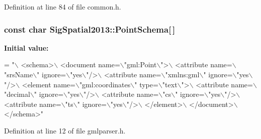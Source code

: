 Definition at line 84 of file common.\-h.

\hypertarget{namespaceSigSpatial2013_a40970b19a17f8bf52c4dad47be296e71}{
\subsubsection[{Point\-Schema}]{\setlength{\rightskip}{0pt plus 5cm}const char Sig\-Spatial2013\-::\-Point\-Schema\mbox{[}$\,$\mbox{]}}}\label{namespaceSigSpatial2013_a40970b19a17f8bf52c4dad47be296e71}
{\bfseries Initial value\-:}
\begin{DoxyCode}
= \textcolor{stringliteral}{"\(\backslash\)}
\textcolor{stringliteral}{<schema>\(\backslash\)}
\textcolor{stringliteral}{  <document name=\(\backslash\)"gml:Point\(\backslash\)">\(\backslash\)}
\textcolor{stringliteral}{    <attribute name=\(\backslash\)"srsName\(\backslash\)" ignore=\(\backslash\)"yes\(\backslash\)"/>\(\backslash\)}
\textcolor{stringliteral}{    <attribute name=\(\backslash\)"xmlns:gml\(\backslash\)" ignore=\(\backslash\)"yes\(\backslash\)"/>\(\backslash\)}
\textcolor{stringliteral}{    <element name=\(\backslash\)"gml:coordinates\(\backslash\)" type=\(\backslash\)"text\(\backslash\)">\(\backslash\)}
\textcolor{stringliteral}{      <attribute name=\(\backslash\)"decimal\(\backslash\)" ignore=\(\backslash\)"yes\(\backslash\)"/>\(\backslash\)}
\textcolor{stringliteral}{      <attribute name=\(\backslash\)"cs\(\backslash\)" ignore=\(\backslash\)"yes\(\backslash\)"/>\(\backslash\)}
\textcolor{stringliteral}{      <attribute name=\(\backslash\)"ts\(\backslash\)" ignore=\(\backslash\)"yes\(\backslash\)"/>\(\backslash\)}
\textcolor{stringliteral}{    </element>\(\backslash\)}
\textcolor{stringliteral}{  </document>\(\backslash\)}
\textcolor{stringliteral}{</schema>"}
\end{DoxyCode}


Definition at line 12 of file gmlparser.\-h.

